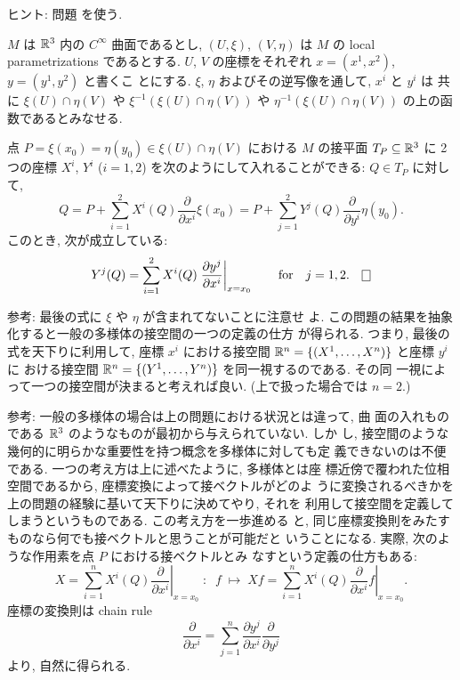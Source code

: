 \documentclass[12pt,twoside]{jarticle}
\def\R{{\Bbb R}} %
\def\pd#1#2{\frac{\partial #1}{\partial #2}}
\begin{document}
\noindent ヒント: 問題  を使う.

\medskip

$M$ は $\R^3$ 内の $C^\infty$ 曲面であるとし, %
$(U,\xi)$, $(V,\eta)$ は $M$ の local parametrizations であるとする. %
$U$, $V$ の座標をそれぞれ $x = (x^1, x^2)$, $y = (y^1, y^2)$ と書くこ
とにする. $\xi$, $\eta$ およびその逆写像を通して, $x^i$ と $y^i$ は %
共に $\xi(U)\cap\eta(V)$ や $\xi^{-1}(\xi(U)\cap\eta(V))$ や %
$\eta^{-1}(\xi(U)\cap\eta(V))$ の上の函数であるとみなせる.

\begin{question}
  点 $P = \xi(x_0) = \eta(y_0) \in \xi(U)\cap\eta(V)$ における %
  $M$ の接平面 $T_P \subseteq \R^3$ に 2 つの座標 $X^i$, $Y^i$ %
  ($i = 1,2$) を次のようにして入れることができる: $Q\in T_P$ に対して,
  \[
    Q
    = P + \sum_{i=1}^2 X^i(Q) \pd{}{x^i}\xi(x_0)
    = P + \sum_{j=1}^2 Y^j(Q) \pd{}{y^i}\eta(y_0).
  \] %
  このとき, 次が成立している:
  \[
    Y^j(Q) = \sum_{i=1}^2 X^i(Q) \left.\pd{y^j}{x^i}\right|_{x=x_0}
    \qquad\text{for}\quad
    j = 1,2.    
  \qed
  \] %
\end{question}

\noindent 参考: 最後の式に $\xi$ や $\eta$ が含まれてないことに注意せ
よ. この問題の結果を抽象化すると一般の多様体の接空間の一つの定義の仕方
が得られる. つまり, 最後の式を天下りに利用して, %
座標 $x^i$ における接空間 $\R^n = \{(X^1,\dots,X^n)\}$ と座標 $y^i$ に
おける接空間 $\R^n = \{(Y^1,\dots,Y^n)\}$ を同一視するのである. その同
一視によって一つの接空間が決まると考えれば良い. 
(上で扱った場合では $n = 2$.)

\smallskip

\noindent 参考: 一般の多様体の場合は上の問題における状況とは違って, 曲
面の入れものである $\R^3$ のようなものが最初から与えられていない. しか
し, 接空間のような幾何的に明らかな重要性を持つ概念を多様体に対しても定
義できないのは不便である. 一つの考え方は上に述べたように, 多様体とは座
標近傍で覆われた位相空間であるから, 座標変換によって接ベクトルがどのよ
うに変換されるべきかを上の問題の経験に基いて天下りに決めてやり, それを
利用して接空間を定義してしまうというものである. この考え方を一歩進める
と, 同じ座標変換則をみたすものなら何でも接ベクトルと思うことが可能だと
いうことになる. 実際, 次のような作用素を点 $P$ における接ベクトルとみ
なすという定義の仕方もある:
\[
  X = \sum_{i=1}^n X^i(Q) \left.\pd{}{x^i}\right|_{x=x_0}
  \;\colon\;\;
  f
  \;\mapsto\;
  Xf = \sum_{i=1}^n X^i(Q) \left.\pd{}{x^i}f\right|_{x=x_0}.
\]
座標の変換則は chain rule
\[
  \pd{}{x^i} = \sum_{j=1}^n \pd{y^j}{x^i}\pd{}{y^j}
\]
より, 自然に得られる.
\end{document}
